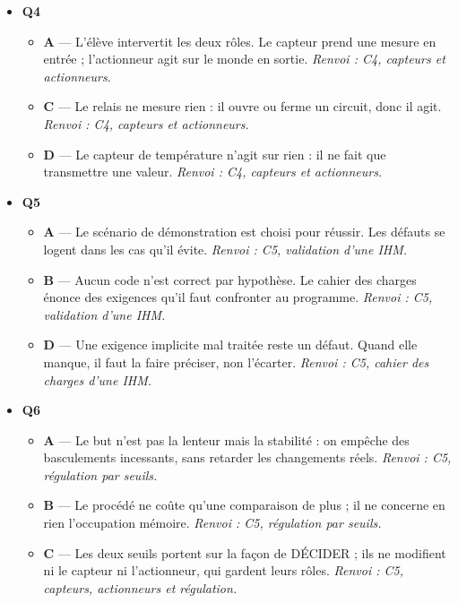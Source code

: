 \begin{itemize}
\begin{itemize}
  \end{itemize}
  \item \textbf{Q4}
  \begin{itemize}
    \item \textbf{A} — L'élève intervertit les deux rôles. Le capteur prend une mesure en entrée ; l'actionneur agit sur le monde en sortie. \emph{Renvoi : C4, capteurs et actionneurs.}
    \item \textbf{C} — Le relais ne mesure rien : il ouvre ou ferme un circuit, donc il agit. \emph{Renvoi : C4, capteurs et actionneurs.}
    \item \textbf{D} — Le capteur de température n'agit sur rien : il ne fait que transmettre une valeur. \emph{Renvoi : C4, capteurs et actionneurs.}
  \end{itemize}
  \item \textbf{Q5}
  \begin{itemize}
    \item \textbf{A} — Le scénario de démonstration est choisi pour réussir. Les défauts se logent dans les cas qu'il évite. \emph{Renvoi : C5, validation d'une IHM.}
    \item \textbf{B} — Aucun code n'est correct par hypothèse. Le cahier des charges énonce des exigences qu'il faut confronter au programme. \emph{Renvoi : C5, validation d'une IHM.}
    \item \textbf{D} — Une exigence implicite mal traitée reste un défaut. Quand elle manque, il faut la faire préciser, non l'écarter. \emph{Renvoi : C5, cahier des charges d'une IHM.}
  \end{itemize}
  \item \textbf{Q6}
  \begin{itemize}
    \item \textbf{A} — Le but n'est pas la lenteur mais la stabilité : on empêche des basculements incessants, sans retarder les changements réels. \emph{Renvoi : C5, régulation par seuils.}
    \item \textbf{B} — Le procédé ne coûte qu'une comparaison de plus ; il ne concerne en rien l'occupation mémoire. \emph{Renvoi : C5, régulation par seuils.}
    \item \textbf{C} — Les deux seuils portent sur la façon de DÉCIDER ; ils ne modifient ni le capteur ni l'actionneur, qui gardent leurs rôles. \emph{Renvoi : C5, capteurs, actionneurs et régulation.}
  \end{itemize}
\end{itemize}
\fi
